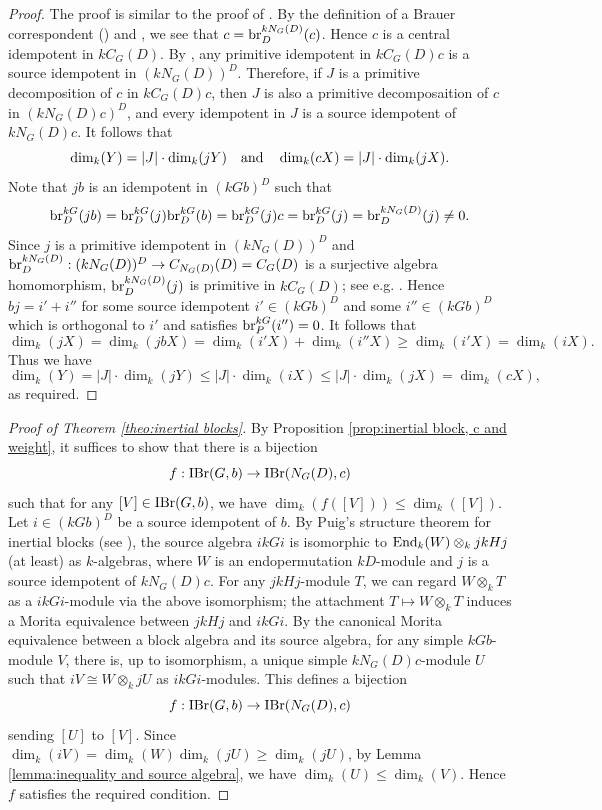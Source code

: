 \documentclass[preprint,12pt,3p]{elsarticle}
\def\IBr{{\rm IBr}}
\def\br{{\rm br}}
\def\End{{\rm End}}
\begin{document}
\begin{proof}
The proof is similar to the proof of \cite[Lemma 3.2]{Lin25}.  By the definition of a Brauer correspondent (\cite[Theorem 6.7.1]{Lin18b}) and \cite[Theorem 6.2.6 (ii)]{Lin18b}, we see that $c=\br_D^{kN_G(D)}(c)$. Hence $c$ is a central idempotent in $kC_G(D)$. By \cite[Theorem 6.14.1]{Lin18b}, any primitive idempotent in $kC_G(D)c$ is a source idempotent in $(kN_G(D))^D$. Therefore, if $J$ is a primitive decomposition of $c$ in $kC_G(D)c$, then $J$ is also a primitive decomposaition of $c$ in $(kN_G(D)c)^D$, and every idempotent in $J$ is a source idempotent of $kN_G(D)c$. It follows that
$$\dim_k(Y)=|J|\cdot\dim_k(jY)~~~{\rm and}~~~\dim_k(cX)=|J|\cdot \dim_k(jX).$$ 
Note that $jb$ is an idempotent in $(kGb)^D$ such that $$\br_D^{kG}(jb)=\br_D^{kG}(j)\br_D^{kG}(b)=\br_D^{kG}(j)c=\br_D^{kG}(j)=\br_D^{kN_G(D)}(j)\neq 0.$$ 
Since $j$ is a primitive idempotent in $(kN_G(D))^D$ and $\br_D^{kN_G(D)}:(kN_G(D))^D\to C_{N_G(D)}(D)=C_G(D)$ is a surjective algebra homomorphism, $\br_D^{kN_G(D)}(j)$ is primitive in $kC_G(D)$; see e.g. \cite[Theorem 4.7.1 (ii)]{Lin18a}. Hence $bj=i'+i''$ for some source idempotent $i'\in (kGb)^D$ and some $i''\in (kGb)^D$ which is orthogonal to $i'$ and satisfies $\br_P^{kG}(i'')=0$. It follows that 
$$\dim_k(jX)=\dim_k(jbX)=\dim_k(i'X)+\dim_k(i''X)\geq \dim_k(i'X)=\dim_k(iX).$$
Thus we have
$$\dim_k(Y)=|J|\cdot\dim_k(jY)\leq |J|\cdot\dim_k(iX)\leq |J|\cdot\dim_k(jX)=\dim_k(cX),$$
as required.
\end{proof}

\begin{proof}[Proof of Theorem \ref{theo:inertial blocks}]
By Proposition \ref{prop:inertial block, c and weight}, it suffices to show that there is a bijection 
$$f:\IBr(G,b)\to\IBr(N_G(D),c)$$ 
such that for any $[V]\in \IBr(G,b)$, we have $\dim_k(f([V]))\leq \dim_k([V])$. Let $i\in(kGb)^D$ be a source idempotent of $b$.
By Puig's structure theorem for inertial blocks (see \cite{Puig11}), the source algebra $ikGi$ is isomorphic to $\End_k(W)\otimes_k jkHj$ (at least) as $k$-algebras, where $W$ is an endopermutation $kD$-module and $j$ is a source idempotent of $kN_G(D)c$. For any $jkHj$-module $T$, we can regard $W\otimes_kT$ as a $ikGi$-module via the above isomorphism; the attachment $T\mapsto W\otimes_k T$ induces a Morita equivalence between $jkHj$ and $ikGi$. By the canonical Morita equivalence between a block algebra and its source algebra, for any simple $kGb$-module $V$, there is, up to isomorphism, a unique simple $kN_G(D)c$-module $U$ such that $iV\cong W\otimes_k jU$ as $ikGi$-modules. This defines a bijection 
$$f:\IBr(G,b)\to\IBr(N_G(D),c)$$ 
sending $[U]$ to $[V]$.
Since $\dim_k(iV)=\dim_k(W)\dim_k(jU)\geq \dim_k(jU)$, by Lemma \ref{lemma:inequality and source algebra}, we have $\dim_k(U)\leq \dim_k(V)$. Hence $f$ satisfies the required condition.
\end{proof}
\end{document}
